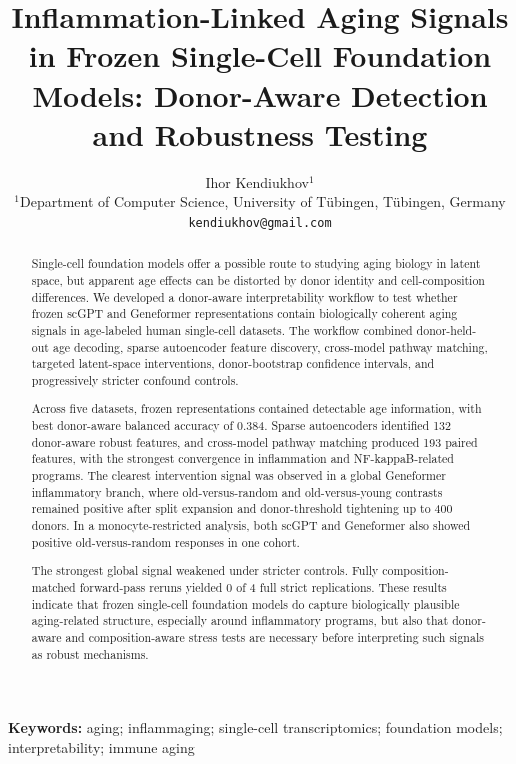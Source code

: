 \documentclass[11pt]{article}
\title{Inflammation-Linked Aging Signals in Frozen Single-Cell Foundation Models: Donor-Aware Detection and Robustness Testing}
\author{Ihor Kendiukhov$^{1}$\\$^{1}$Department of Computer Science, University of T\"ubingen, T\"ubingen, Germany\\\texttt{kendiukhov@gmail.com}}
\date{}
\begin{document}
\maketitle

\begin{abstract}
Single-cell foundation models offer a possible route to studying aging biology in latent space, but apparent age effects can be distorted by donor identity and cell-composition differences. We developed a donor-aware interpretability workflow to test whether frozen scGPT and Geneformer representations contain biologically coherent aging signals in age-labeled human single-cell datasets. The workflow combined donor-held-out age decoding, sparse autoencoder feature discovery, cross-model pathway matching, targeted latent-space interventions, donor-bootstrap confidence intervals, and progressively stricter confound controls.

Across five datasets, frozen representations contained detectable age information, with best donor-aware balanced accuracy of 0.384. Sparse autoencoders identified 132 donor-aware robust features, and cross-model pathway matching produced 193 paired features, with the strongest convergence in inflammation and NF-kappaB-related programs. The clearest intervention signal was observed in a global Geneformer inflammatory branch, where old-versus-random and old-versus-young contrasts remained positive after split expansion and donor-threshold tightening up to 400 donors. In a monocyte-restricted analysis, both scGPT and Geneformer also showed positive old-versus-random responses in one cohort.

The strongest global signal weakened under stricter controls. Fully composition-matched forward-pass reruns yielded 0 of 4 full strict replications. These results indicate that frozen single-cell foundation models do capture biologically plausible aging-related structure, especially around inflammatory programs, but also that donor-aware and composition-aware stress tests are necessary before interpreting such signals as robust mechanisms.
\end{abstract}

\noindent\textbf{Keywords:} aging; inflammaging; single-cell transcriptomics; foundation models; interpretability; immune aging
\end{document}
